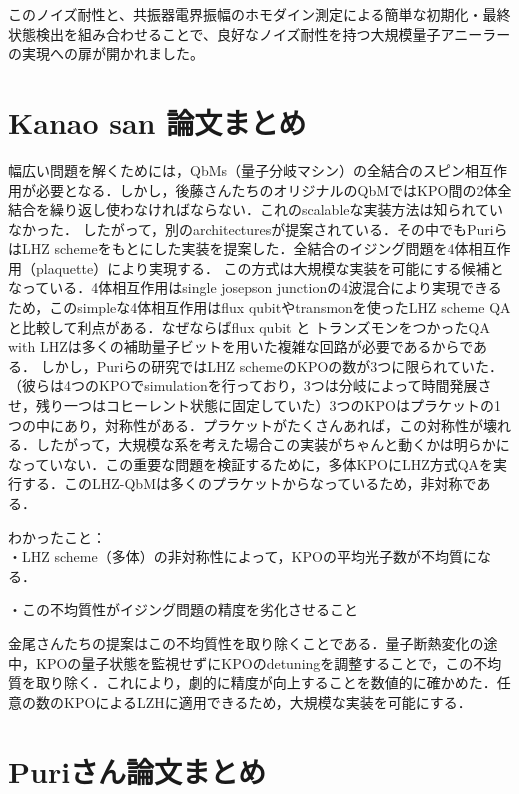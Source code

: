  このノイズ耐性と、共振器電界振幅のホモダイン測定による簡単な初期化・最終状態検出を組み合わせることで、良好なノイズ耐性を持つ大規模量子アニーラーの実現への扉が開かれました。




\section{Kanao san 論文まとめ}
幅広い問題を解くためには，QbMs（量子分岐マシン）の全結合のスピン相互作用が必要となる．しかし，後藤さんたちのオリジナルのQbMではKPO間の2体全結合を繰り返し使わなければならない．これのscalableな実装方法は知られていなかった．
したがって，別のarchitecturesが提案されている．その中でもPuriらはLHZ schemeをもとにした実装を提案した．全結合のイジング問題を4体相互作用（plaquette）により実現する．
この方式は大規模な実装を可能にする候補となっている．4体相互作用はsingle josepson junctionの4波混合により実現できるため，このsimpleな4体相互作用はflux qubitやtransmonを使ったLHZ scheme QAと比較して利点がある．なぜならばflux qubit と トランズモンをつかったQA with LHZは多くの補助量子ビットを用いた複雑な回路が必要であるからである．
しかし，Puriらの研究ではLHZ schemeのKPOの数が3つに限られていた．（彼らは4つのKPOでsimulationを行っており，3つは分岐によって時間発展させ，残り一つはコヒーレント状態に固定していた）3つのKPOはプラケットの1つの中にあり，対称性がある．プラケットがたくさんあれば，この対称性が壊れる．したがって，大規模な系を考えた場合この実装がちゃんと動くかは明らかになっていない．この重要な問題を検証するために，多体KPOにLHZ方式QAを実行する．このLHZ-QbMは多くのプラケットからなっているため，非対称である．

わかったこと：\\

・LHZ scheme（多体）の非対称性によって，KPOの平均光子数が不均質になる．


・この不均質性がイジング問題の精度を劣化させること

金尾さんたちの提案はこの不均質性を取り除くことである．量子断熱変化の途中，KPOの量子状態を監視せずにKPOのdetuningを調整することで，この不均質を取り除く．これにより，劇的に精度が向上することを数値的に確かめた．任意の数のKPOによるLZHに適用できるため，大規模な実装を可能にする．



\section{Puriさん論文まとめ}





